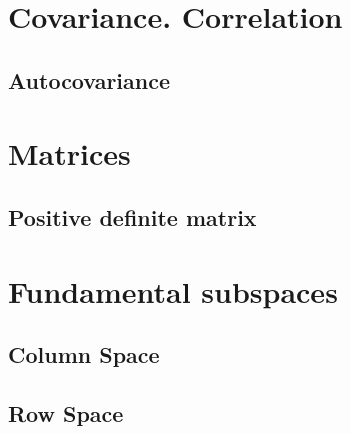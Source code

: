 \section*{Covariance. Correlation}
\subsection{Autocovariance}

\section{Matrices}
\subsection{Positive definite matrix}

\section{Fundamental subspaces}
\subsection{Column Space}
\subsection{Row Space}